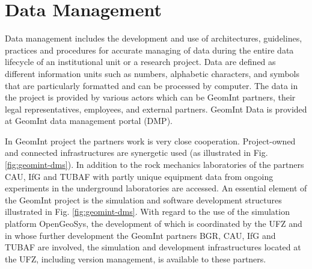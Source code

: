 \chapter{Data Management}

Data management includes the development and use of architectures, guidelines, practices and procedures for accurate managing of data during the entire data lifecycle of an institutional unit or a research project. Data are defined as different information units such as numbers, alphabetic characters, and symbols that are particularly formatted and can be processed by computer. The data in the project is provided by various actors which can be GeomInt partners, their legal representatives, employees, and external partners. GeomInt Data is provided at GeomInt data management portal (DMP).

In GeomInt project the partners work is very close cooperation. Project-owned and connected infrastructures are synergetic used (as illustrated in Fig. \ref{fig:geomint-dms}). In addition to the rock mechanics laboratories of the partners CAU, IfG and TUBAF with partly unique equipment data from ongoing experiments in the underground laboratories are accessed. An essential element of the GeomInt project is the simulation and software development structures illustrated in Fig. \ref{fig:geomint-dms}. With regard to the use of the simulation platform OpenGeoSys, the development of which is coordinated by the UFZ and in whose further development the GeomInt partners BGR, CAU, IfG and TUBAF are involved, the simulation and development infrastructures located at the UFZ, including version management, is available to these partners. 

